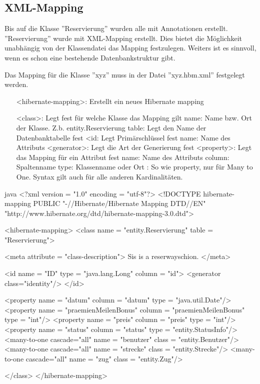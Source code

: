 	\clearpage

	\subsection{XML-Mapping}
	
	Bis auf die Klasse ''Reservierung'' wurden alle mit Annotationen erstellt. ''Reservierung'' wurde mit XML-Mapping erstellt. Dies bietet die Möglichkeit unabhängig von der Klassendatei das Mapping festzulegen. Weiters ist es sinnvoll, wenn es schon eine bestehende Datenbankstruktur gibt.
	
	Das Mapping für die Klasse ''xyz'' muss in der Datei ''xyz.hbm.xml'' festgelegt werden.
	
	\begin{itemize}
		\item[] <hibernate-mapping>: Erstellt ein neues Hibernate mapping
		\item[] <class>: Legt fest für welche Klasse das Mapping gilt
		\subitem name: Name bzw. Ort der Klasse. Z.b. entity.Reservierung
		\subitem table: Legt den Name der Datenbanktabelle fest
		\subitem <id: Legt Primärschlüssel fest
		\subsubitem name: Name des Attributs
		\subsubitem <generator>: Legt die Art der Generierung fest
		\subitem <property>: Legt das Mapping für ein Attribut fest
		\subsubitem name: Name des Attributs
		\subsubitem column: Spaltenname
		\subsubitem type: Klassenname oder Ort
		\subitem <many-to-one>: So wie property, nur für Many to One. Syntax gilt auch für alle anderen Kardinalitäten.
	\end{itemize}
	
	\begin{code}[]{java}
		<?xml version = "1.0" encoding = "utf-8"?>
		<!DOCTYPE hibernate-mapping PUBLIC
		"-//Hibernate/Hibernate Mapping DTD//EN"
		"http://www.hibernate.org/dtd/hibernate-mapping-3.0.dtd">
		
		<hibernate-mapping>
		<class name = "entity.Reservierung" table = "Reservierung">
		
		<meta attribute = "class-description">
		Sis is a reserwayschion.
		</meta>
		
		<id name = "ID" type = "java.lang.Long" column = "id">
		<generator class="identity"/>
		</id>
		
		<property name = "datum" column = "datum" type = "java.util.Date"/>
		<property name = "praemienMeilenBonus" column = "praemienMeilenBonus" type = "int"/>
		<property name = "preis" column = "preis" type = "int"/>
		<property name = "status" column = "status" type = "entity.StatusInfo"/>
		<many-to-one cascade="all" name = "benutzer" class = "entity.Benutzer"/>
		<many-to-one cascade="all" name = "strecke"  class = "entity.Strecke"/>
		<many-to-one cascade="all" name = "zug" class = "entity.Zug"/>
		
		</class>
		</hibernate-mapping>
	\end{code}
	
